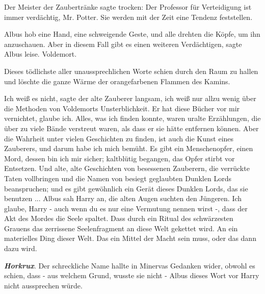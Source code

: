 Der Meister der Zaubertränke sagte trocken: \glqq{}Der Professor für Verteidigung
ist immer verdächtig, Mr. Potter. Sie werden mit der Zeit eine Tendenz
feststellen.\grqq{}

Albus hob eine Hand, eine schweigende Geste, und alle drehten die Köpfe, um ihn
anzuschauen. \glqq{}Aber in diesem Fall gibt es einen weiteren
Verdächtigen\grqq{}, sagte Albus leise. \glqq{}Voldemort.\grqq{}

Dieses tödlichste aller unaussprechlichen Worte schien durch den Raum zu hallen
und löschte die ganze Wärme der orangefarbenen Flammen des Kamins.

\glqq{}Ich weiß es nicht\grqq{}, sagte der alte Zauberer langsam, \glqq{}ich weiß
nur allzu wenig über die Methoden von Voldemorts Unsterblichkeit. Er hat diese
Bücher vor mir vernichtet, glaube ich. Alles, was ich finden konnte, waren
uralte Erzählungen, die über zu viele Bände verstreut waren, als dass er sie
hätte entfernen können. Aber die Wahrheit unter vielen Geschichten zu finden,
ist auch die Kunst eines Zauberers, und darum habe ich mich bemüht. Es gibt ein
Menschenopfer, einen Mord, dessen bin ich mir sicher; kaltblütig begangen, das
Opfer stirbt vor Entsetzen. Und alte, alte Geschichten von besessenen Zauberern,
die verrückte Taten vollbringen und die Namen von besiegt geglaubten Dunklen
Lords beanspruchen; und es gibt gewöhnlich ein Gerät dieses Dunklen Lords, das
sie benutzen ...\grqq{} Albus sah Harry an, die alten Augen suchten den
Jüngeren. \glqq{}Ich glaube, Harry - auch wenn du es nur eine Vermutung nennen
wirst -, dass der Akt des Mordes die Seele spaltet. Dass durch ein Ritual des
schwärzesten Grauens das zerrissene Seelenfragment an diese Welt gekettet wird.
An ein materielles Ding dieser Welt. Das ein Mittel der Macht sein muss, oder
das dann dazu wird.\grqq{}

\textbf{\emph{Horkrux}}. Der schreckliche Name hallte in Minervas Gedanken
wider, obwohl es schien, dass - aus welchem Grund, wusste sie nicht - Albus
dieses Wort vor Harry nicht aussprechen würde.


